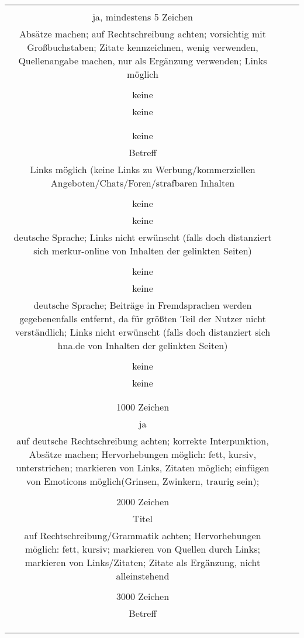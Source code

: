 \begin{landscape}
\begin{tabular}{ccc}
{		1500 Zeichen\\
		ja, mindestens 5 Zeichen\\
		Absätze machen; auf Rechtschreibung achten; vorsichtig mit Großbuchstaben; Zitate kennzeichnen, wenig verwenden, Quellenangabe machen, nur als Ergänzung verwenden; Links möglich \\
		&
		\\
		keine\\
		keine\\
		\\
		&%
		\\
		keine\\
		Betreff\\
		Links möglich (keine Links zu Werbung/kommerziellen Angeboten/Chats/Foren/strafbaren Inhalten\\
		&%
		\\
		keine\\
		keine\\
		deutsche Sprache; Links nicht erwünscht (falls doch distanziert sich merkur-online von Inhalten der gelinkten Seiten)\\
		&
		\\
		keine\\
		keine\\
		deutsche Sprache; Beiträge in Fremdsprachen werden gegebenenfalls entfernt, da für größten Teil der Nutzer nicht verständlich; Links nicht erwünscht (falls doch distanziert sich hna.de von Inhalten der gelinkten Seiten)\\
		&
		\\
		keine\\
		keine\\
		\\
		&
		\\
		1000 Zeichen\\
		ja\\
		auf deutsche Rechtschreibung achten; korrekte Interpunktion, Absätze machen; Hervorhebungen möglich: fett, kursiv, unterstrichen; markieren von Links, Zitaten möglich; einfügen von Emoticons möglich(Grinsen, Zwinkern, traurig sein); \\
		&%
		\\
		2000 Zeichen\\
		Titel\\
		auf Rechtschreibung/Grammatik achten; Hervorhebungen möglich: fett, kursiv; markieren von Quellen durch Links; markieren von Links/Zitaten; Zitate als Ergänzung, nicht alleinstehend\\
		&
		\\
		3000 Zeichen\\
		Betreff\\
		\\
		&
		\\ \hline
		
}
\end{tabular}
\end{landscape}
